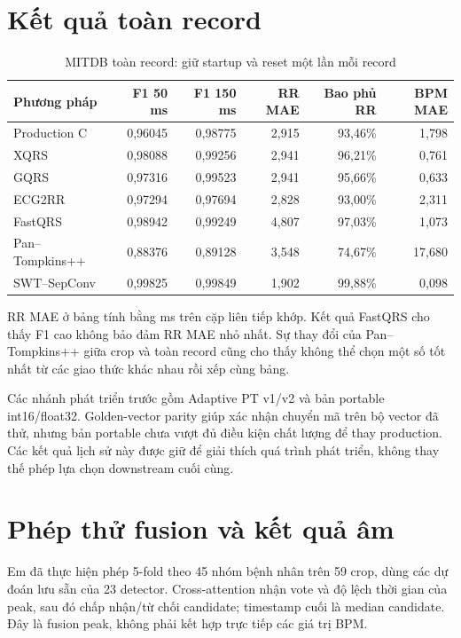 \documentclass[12pt,a4paper,oneside]{report}
\begin{document}
\section{Kết quả toàn record}
\begin{table}[H]
\centering\small
\caption{MITDB toàn record: giữ startup và reset một lần mỗi record}
\begin{tabular}{lrrrrr}
\toprule Phương pháp & F1 50 ms & F1 150 ms & RR MAE & Bao phủ RR & BPM MAE\\\midrule
Production C & 0,96045 & 0,98775 & 2,915 & 93,46\% & 1,798\\
XQRS & 0,98088 & 0,99256 & 2,941 & 96,21\% & 0,761\\
GQRS & 0,97316 & 0,99523 & 2,941 & 95,66\% & 0,633\\
ECG2RR & 0,97294 & 0,97694 & 2,828 & 93,00\% & 2,311\\
FastQRS & 0,98942 & 0,99249 & 4,807 & 97,03\% & 1,073\\
Pan--Tompkins++ & 0,88376 & 0,89128 & 3,548 & 74,67\% & 17,680\\
SWT--SepConv & 0,99825 & 0,99849 & 1,902 & 99,88\% & 0,098\\
\bottomrule
\end{tabular}
\end{table}
RR MAE ở bảng tính bằng ms trên cặp liên tiếp khớp. Kết quả FastQRS cho thấy F1 cao không bảo đảm RR MAE nhỏ nhất. Sự thay đổi của Pan--Tompkins++ giữa crop và toàn record cũng cho thấy không thể chọn một số tốt nhất từ các giao thức khác nhau rồi xếp cùng bảng.

Các nhánh phát triển trước gồm Adaptive PT v1/v2 và bản portable int16/float32. Golden-vector parity giúp xác nhận chuyển mã trên bộ vector đã thử, nhưng bản portable chưa vượt đủ điều kiện chất lượng để thay production. Các kết quả lịch sử này được giữ để giải thích quá trình phát triển, không thay thế phép lựa chọn downstream cuối cùng.

\section{Phép thử fusion và kết quả âm}
Em đã thực hiện phép 5-fold theo 45 nhóm bệnh nhân trên 59 crop, dùng các dự đoán lưu sẵn của 23 detector. Cross-attention nhận vote và độ lệch thời gian của peak, sau đó chấp nhận/từ chối candidate; timestamp cuối là median candidate. Đây là fusion peak, không phải kết hợp trực tiếp các giá trị BPM.
\end{document}
